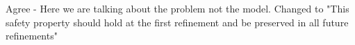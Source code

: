\documentclass{response}
\begin{document}
\begin{response}
\end{response}

\begin{comment}{Reviewer \#3}
  * Line -7: "This safety property is introduced ..." : where, when?
\end{comment}

\begin{response}
	Agree - Here we are talking about the problem not the model. Changed to "This safety property should hold at the first refinement and be preserved in all future refinements"
\end{response}

\begin{comment}{Reviewer \#3}
* Figure 2(b): "last_byte_send" -> "last_byte_sent".
\end{comment}

\begin{response}
\end{response}

\begin{comment}{Reviewer \#3}
  Page 7:

  * Mid: "Ancillary data, with corresponding actions to alter it, can
  ..." - something is wrong with this sentence.
\end{comment}

\begin{response}
\end{response}

\begin{comment}{Reviewer \#3}
* Line -4: I don't understand: "Note that external triggers are always unguarded ...".
\end{comment}

\begin{response}
\end{response}

\begin{comment}{Reviewer \#3}
  Page 8:

* The next couple of pages is a lot of English without some structure to hang it up on.
\end{comment}
\end{document}
